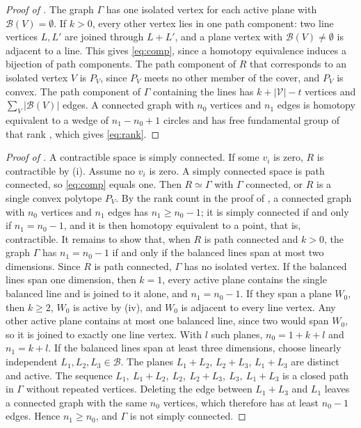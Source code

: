 \documentclass[11pt]{article}
\theoremstyle{remark}
\begin{document}
\begin{proof}[Proof of ]
The graph $\Gamma$ has one isolated vertex for each active plane with $\mathcal B(V)=\emptyset$. If $k>0$, every other
vertex lies in one path component: two line vertices $L,L'$ are joined through $L+L'$, and a plane vertex with
$\mathcal B(V)\neq\emptyset$ is adjacent to a line. This gives \eqref{eq:comp}, since a homotopy equivalence induces a
bijection of path components. The path component of $R$ that corresponds to an isolated vertex $V$ is $P_V$, since
$P_V$ meets no other member of the cover, and $P_V$ is convex. The path component of $\Gamma$ containing the lines has
$k+|\mathcal V|-t$ vertices and $\sum_V|\mathcal B(V)|$ edges. A connected graph with $n_0$ vertices and $n_1$ edges is homotopy equivalent to a
wedge of $n_1-n_0+1$ circles and has free fundamental group of that rank \cite[Proposition~1A.2 and its proof, and Exercise~1A.3]{Hatcher}, which gives \eqref{eq:rank}.
\end{proof}

\begin{proof}[Proof of ]
A contractible space is simply connected. If some $v_i$ is zero, $R$ is contractible by (i). Assume no
$v_i$ is zero. A simply connected space is path connected, so \eqref{eq:comp} equals one. Then $R\simeq\Gamma$ with
$\Gamma$ connected, or $R$ is a
single convex polytope $P_V$. By the rank count in the proof of , a connected graph with $n_0$ vertices
and $n_1$ edges has $n_1\ge n_0-1$; it is simply connected if and only if $n_1=n_0-1$, and it is then homotopy
equivalent to a point, that is, contractible. It remains to show that, when $R$ is path connected and $k>0$, the
graph $\Gamma$ has $n_1=n_0-1$ if and only if the balanced lines span at most two dimensions. Since $R$ is path
connected, $\Gamma$ has no isolated vertex. If the balanced lines span one dimension, then $k=1$, every active plane
contains the single balanced line and is joined to it alone, and $n_1=n_0-1$. If they span a plane $W_0$, then $k\ge 2$, $W_0$ is active by (iv), and $W_0$ is
adjacent to every line vertex. Any other active plane contains at most one balanced line, since two would span $W_0$,
so it is joined to exactly one line vertex. With $l$ such planes, $n_0=1+k+l$ and $n_1=k+l$. If the balanced lines
span at least three dimensions, choose linearly independent
$L_1,L_2,L_3\in\mathcal B$. The planes $L_1+L_2$, $L_2+L_3$, $L_1+L_3$ are distinct and active. The sequence
$L_1,\ L_1+L_2,\ L_2,\ L_2+L_3,\ L_3,\ L_1+L_3$ is a closed path in $\Gamma$ without repeated vertices. Deleting
the edge between $L_1+L_3$ and $L_1$ leaves a connected graph with the same $n_0$ vertices, which therefore has at
least $n_0-1$ edges. Hence $n_1\ge n_0$, and $\Gamma$ is not simply connected.
\end{proof}
\end{document}
